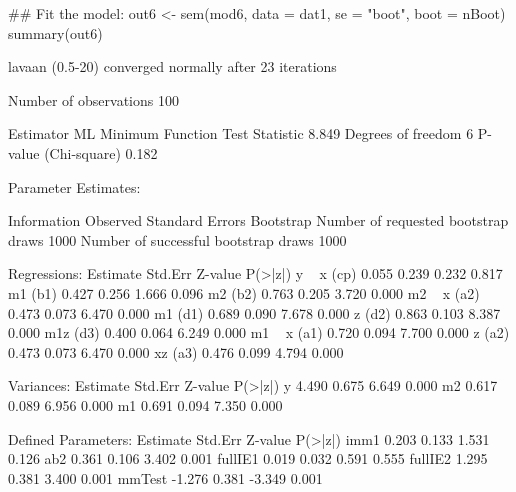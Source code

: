 \begin{Schunk}
\begin{Sinput}
 ## Fit the model:
 out6 <- sem(mod6, data = dat1, se = "boot", boot = nBoot)
 summary(out6)
\end{Sinput}
\begin{Soutput}
lavaan (0.5-20) converged normally after  23 iterations

  Number of observations                           100

  Estimator                                         ML
  Minimum Function Test Statistic                8.849
  Degrees of freedom                                 6
  P-value (Chi-square)                           0.182

Parameter Estimates:

  Information                                 Observed
  Standard Errors                            Bootstrap
  Number of requested bootstrap draws             1000
  Number of successful bootstrap draws            1000

Regressions:
                   Estimate  Std.Err  Z-value  P(>|z|)
  y ~                                                 
    x         (cp)    0.055    0.239    0.232    0.817
    m1        (b1)    0.427    0.256    1.666    0.096
    m2        (b2)    0.763    0.205    3.720    0.000
  m2 ~                                                
    x         (a2)    0.473    0.073    6.470    0.000
    m1        (d1)    0.689    0.090    7.678    0.000
    z         (d2)    0.863    0.103    8.387    0.000
    m1z       (d3)    0.400    0.064    6.249    0.000
  m1 ~                                                
    x         (a1)    0.720    0.094    7.700    0.000
    z         (a2)    0.473    0.073    6.470    0.000
    xz        (a3)    0.476    0.099    4.794    0.000

Variances:
                   Estimate  Std.Err  Z-value  P(>|z|)
    y                 4.490    0.675    6.649    0.000
    m2                0.617    0.089    6.956    0.000
    m1                0.691    0.094    7.350    0.000

Defined Parameters:
                   Estimate  Std.Err  Z-value  P(>|z|)
    imm1              0.203    0.133    1.531    0.126
    ab2               0.361    0.106    3.402    0.001
    fullIE1           0.019    0.032    0.591    0.555
    fullIE2           1.295    0.381    3.400    0.001
    mmTest           -1.276    0.381   -3.349    0.001
\end{Soutput}
\end{Schunk}
